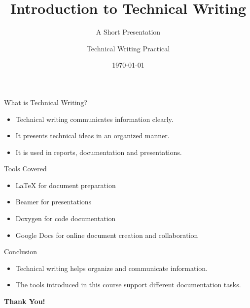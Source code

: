 \documentclass{beamer}
\title{Introduction to Technical Writing}
\subtitle{A Short Presentation}
\author{Technical Writing Practical}
\institute{MNIT Jaipur}
\date{\today}
\begin{document}
\begin{frame}
    \titlepage
\end{frame}

\begin{frame}{What is Technical Writing?}
    \begin{itemize}
        \item Technical writing communicates information clearly.
        \item It presents technical ideas in an organized manner.
        \item It is used in reports, documentation and presentations.
    \end{itemize}
\end{frame}

\begin{frame}{Tools Covered}
    \begin{itemize}
        \item \LaTeX{} for document preparation
        \item Beamer for presentations
        \item Doxygen for code documentation
        \item Google Docs for online document creation and collaboration
    \end{itemize}
\end{frame}

\begin{frame}{Conclusion}
    \begin{itemize}
        \item Technical writing helps organize and communicate information.
        \item The tools introduced in this course support different documentation tasks.
    \end{itemize}
    \vfill
    \centering
    \textbf{Thank You!}
\end{frame}
\end{document}
